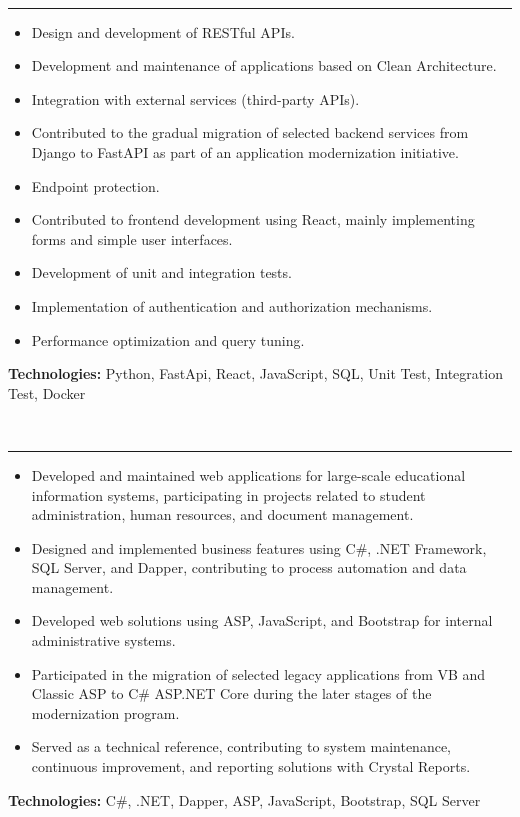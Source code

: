 \documentclass[10pt,a4paper]{article}
\begin{document}
\\[-3pt]
{\rule{\textwidth}{0.25pt}}
\begin{itemize}
    \item Design and development of RESTful APIs.
    \item Development and maintenance of applications based on Clean Architecture.
    \item Integration with external services (third-party APIs).
    \item Contributed to the gradual migration of selected backend services from Django to FastAPI as part of an application modernization initiative.
    \item Endpoint protection.
    \item Contributed to frontend development using React, mainly implementing forms and simple user interfaces.
    \item Development of unit and integration tests.
    \item Implementation of authentication and authorization mechanisms.
    \item Performance optimization and query tuning.
\end{itemize}
\vspace{2pt}
{\small \textbf{Technologies:} Python, FastApi, React, JavaScript, SQL, Unit Test, Integration Test, Docker}

\vspace{3pt}

\\[-3pt]
{\rule{\textwidth}{0.25pt}}
\begin{itemize}
    \item Developed and maintained web applications for large-scale educational information systems, participating in projects related to student administration, human resources, and document management.
    \item Designed and implemented business features using C\#, .NET Framework, SQL Server, and Dapper, contributing to process automation and data management.
    \item Developed web solutions using ASP, JavaScript, and Bootstrap for internal administrative systems. 
    \item Participated in the migration of selected legacy applications from VB and Classic ASP to C\# ASP.NET Core during the later stages of the modernization program.
    \item Served as a technical reference, contributing to system maintenance, continuous improvement, and reporting solutions with Crystal Reports.
\end{itemize}
\vspace{2pt}
{\small \textbf{Technologies:} C\#, .NET, Dapper, ASP, JavaScript, Bootstrap, SQL Server}
\end{document}

